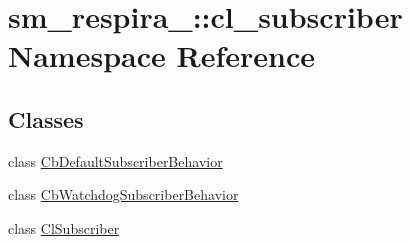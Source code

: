 \hypertarget{namespacesm__respira__1_1_1cl__subscriber}{}\section{sm\+\_\+respira\+\_\+:\+:cl\+\_\+subscriber Namespace Reference}
\label{namespacesm__respira__1_1_1cl__subscriber}
\subsection*{Classes}
\begin{DoxyCompactItemize}
\item 
class \hyperlink{classsm__respira__1_1_1cl__subscriber_1_1CbDefaultSubscriberBehavior}{Cb\+Default\+Subscriber\+Behavior}
\item 
class \hyperlink{classsm__respira__1_1_1cl__subscriber_1_1CbWatchdogSubscriberBehavior}{Cb\+Watchdog\+Subscriber\+Behavior}
\item 
class \hyperlink{classsm__respira__1_1_1cl__subscriber_1_1ClSubscriber}{Cl\+Subscriber}
\end{DoxyCompactItemize}
